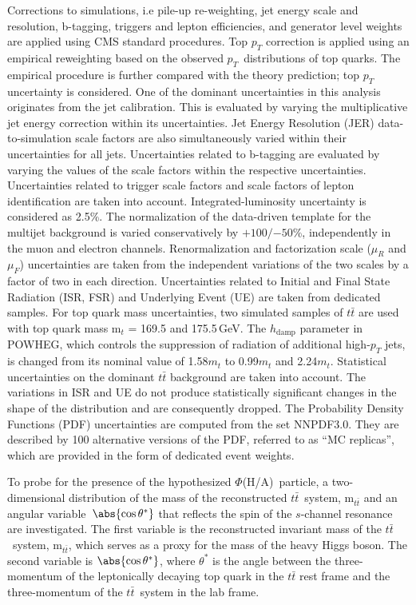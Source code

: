 Corrections to simulations, i.e pile-up re-weighting, jet energy scale and resolution, b-tagging, triggers and lepton efficiencies, and generator level weights are applied using CMS standard procedures. Top $p_{T}$ correction is applied using an empirical reweighting based on the observed $p_{T}$~distributions of top quarks. The empirical procedure is further compared with the theory prediction; top $p_{T}$ uncertainty is considered. One of the dominant uncertainties in this analysis originates from the jet calibration. This is evaluated by varying the multiplicative jet energy correction within its uncertainties. Jet Energy Resolution (JER) data-to-simulation scale factors are also simultaneously varied within their uncertainties for all jets. Uncertainties related to b-tagging are evaluated by varying the values of the scale factors within the respective uncertainties. Uncertainties related to trigger scale factors and scale factors of lepton identification are taken into account. 
Integrated-luminosity uncertainty is considered as 2.5\%. The normalization of the data-driven template for the multijet background is varied conservatively by ${+100}/{-50}$\%, independently in the muon and electron channels. Renormalization and factorization scale ($\mu_{R}$ and $\mu_{F}$) uncertainties are taken from the independent variations of the two scales by a factor of two in each direction. Uncertainties related to Initial and Final State Radiation (ISR, FSR) and Underlying Event (UE) are taken from dedicated samples. For top quark mass uncertainties, two simulated samples of $t\bar t$ are used with top quark mass $\text{m}_t$ = 169.5 and 175.5\,GeV. The $h_{\text{damp}}$ parameter in \textsc{POWHEG}, which controls the suppression of radiation of additional high-$p_{T}$ jets, is changed from its nominal value of 1.58$m_{t}$ to 0.99$m_{t}$ and 2.24$m_{t}$. Statistical uncertainties on the dominant $t\bar t$ background are taken into account. The variations in ISR and UE do not produce statistically significant changes in the shape of the distribution and are consequently dropped. The Probability Density Functions (PDF) uncertainties are computed from the set NNPDF3.0. They are described by 100 alternative versions of the PDF, referred to as ``MC replicas'', which are provided in the form of dedicated event weights. 

To probe for the presence of the hypothesized $\Phi$(H/A)~particle, a two-dimensional distribution of the mass of the reconstructed $t\bar t$~system, m$_{t\bar t}$ and an angular variable~$\abs{\cos\theta^*}$ that reflects the spin of the $s$-channel resonance are investigated. The first variable is the reconstructed invariant mass of the $t\bar t$~system, m$_{t\bar t}$, which serves as a proxy for the mass of the heavy Higgs boson. The second variable is $\abs{\cos\theta^*}$, where $\theta^*$ is the angle between the three-momentum of the leptonically decaying top quark in the $t\bar{t}$ rest frame and the three-momentum of the $t\bar{t}$~system in the lab frame.

